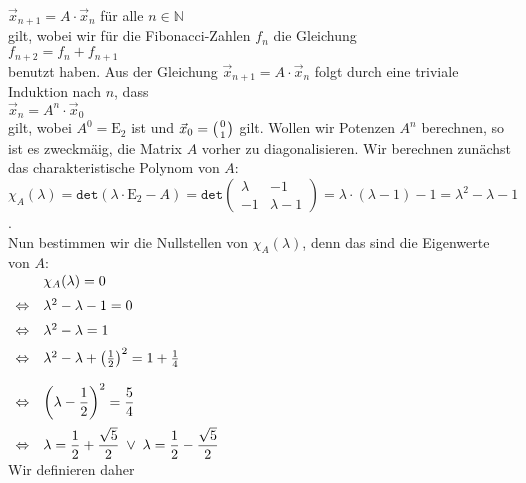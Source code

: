 $\vec{x}_{n+1} = A \cdot \vec{x}_n$ \quad f\"ur alle $n \in \mathbb{N}$
\\[0.2cm]
gilt, wobei wir f\"ur die Fibonacci-Zahlen $f_n$ die Gleichung
\\[0.2cm]
\hspace*{1.3cm}
$f_{n+2} = f_n + f_{n+1}$
\\[0.2cm]
benutzt haben.   Aus der Gleichung $\vec{x}_{n+1} = A \cdot\vec{x}_n$ 
folgt durch eine triviale Induktion nach $n$, dass
\\[0.2cm]
\hspace*{1.3cm}
$\vec{x}_n = A^n \cdot\vec{x}_0$
\\[0.2cm]
gilt, wobei $A^0 = \mathrm{E}_2$ ist und $\vec{x}_0 = \left(0 \atop 1\right)$ gilt.  Wollen wir
Potenzen $A^n$ berechnen, so ist es zweckm\"a\3ig, die Matrix $A$ vorher zu diagonalisieren.  Wir
berechnen zun\"achst das charakteristische Polynom von $A$:
\\[0.2cm]
\hspace*{1.3cm}
$\chi_A(\lambda) = \mathtt{det}(\lambda \cdot \mathrm{E}_2 - A) 
 = \mathtt{det}\left(
   \begin{array}{rr}
     \lambda  &  -1 \\
     -1       & \lambda - 1
   \end{array}
   \right) = \lambda \cdot (\lambda - 1) - 1 = \lambda^2 - \lambda - 1
$.
\\[0.2cm]
Nun bestimmen wir die Nullstellen von $\chi_A(\lambda)$, denn das sind die Eigenwerte von $A$:
\\[0.2cm]
\hspace*{1.3cm}
$
\begin{array}[t]{ll}
                & \chi_A(\lambda) = 0 \\[0.2cm]
\Leftrightarrow & \lambda^2 - \lambda - 1 = 0 \\[0.2cm] 
\Leftrightarrow & \lambda^2 - \lambda     = 1 \\[0.2cm]
\Leftrightarrow & \lambda^2 - \lambda + \left(\frac{1}{2}\right)^2 = 1 + \frac{1}{4} \\[0.4cm]
\Leftrightarrow & \displaystyle\left(\lambda - \frac{1}{2}\right)^2 = \frac{5}{4} \\[0.4cm]
\Leftrightarrow & \displaystyle\lambda = \frac{1}{2} + \frac{\sqrt{5}}{2} \;\vee\; \lambda = \frac{1}{2} - \frac{\sqrt{5}}{2} 
\end{array}
$
\\[0.2cm]
Wir definieren daher
\\[0.2cm]
\hspace*{1.3cm}
